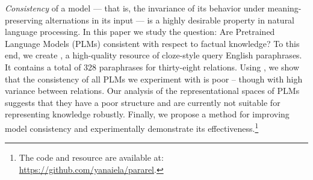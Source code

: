 
\textit{Consistency} of a model --- that is, the invariance
of its behavior under meaning-preserving alternations in its
input --- is a highly desirable property in natural language
processing.  In this paper we study the question: Are
Pretrained Language Models (PLMs) consistent with respect to
factual knowledge?
To this end, we create \resource{}, a
high-quality resource of cloze-style query English
paraphrases. It contains a total of 328 paraphrases for thirty-eight relations. Using \resource{}, we show that the consistency
of all PLMs we experiment with is poor -- though with high
variance between relations.  Our analysis of the
representational spaces of PLMs suggests that they have a
poor structure and are currently not suitable for
representing knowledge robustly. Finally, we propose
a method for improving model consistency and experimentally
demonstrate its effectiveness.\footnote{The code and resource are available at: \url{https://github.com/yanaiela/pararel}.}
